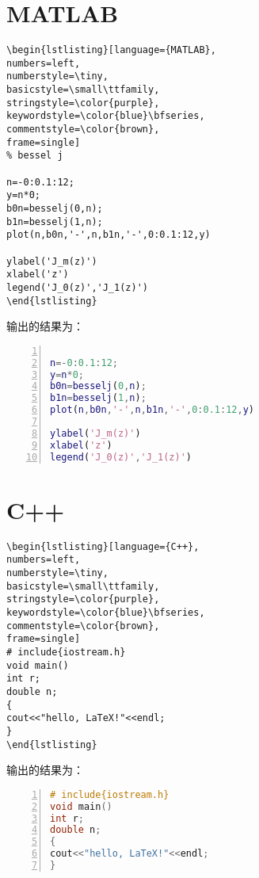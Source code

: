 \section{MATLAB}\label{appendixB-3}
\begin{verbatim}
\begin{lstlisting}[language={MATLAB},
numbers=left,
numberstyle=\tiny,
basicstyle=\small\ttfamily,
stringstyle=\color{purple},
keywordstyle=\color{blue}\bfseries,
commentstyle=\color{brown},
frame=single]
% bessel j

n=-0:0.1:12;
y=n*0;
b0n=besselj(0,n);
b1n=besselj(1,n);
plot(n,b0n,'-',n,b1n,'-',0:0.1:12,y)

ylabel('J_m(z)')
xlabel('z')
legend('J_0(z)','J_1(z)')
\end{lstlisting}
\end{verbatim}
输出的结果为：
\begin{lstlisting}[language={MATLAB},
numbers=left,
numberstyle=\tiny,
basicstyle=\small\ttfamily,
stringstyle=\color{purple},
keywordstyle=\color{blue}\bfseries,
commentstyle=\color{brown},
frame=single]
% bessel j

n=-0:0.1:12;
y=n*0;
b0n=besselj(0,n);
b1n=besselj(1,n);
plot(n,b0n,'-',n,b1n,'-',0:0.1:12,y)

ylabel('J_m(z)')
xlabel('z')
legend('J_0(z)','J_1(z)')
\end{lstlisting}

\section{C++}\label{appendixB-4}
\begin{verbatim}
\begin{lstlisting}[language={C++},
numbers=left,
numberstyle=\tiny,
basicstyle=\small\ttfamily,
stringstyle=\color{purple},
keywordstyle=\color{blue}\bfseries,
commentstyle=\color{brown},
frame=single]
# include{iostream.h}
void main()
int r;
double n;
{
cout<<"hello, LaTeX!"<<endl;
}
\end{lstlisting}
\end{verbatim}
输出的结果为：
\begin{lstlisting}[language={C++},
numbers=left,
numberstyle=\tiny,
basicstyle=\small\ttfamily,
stringstyle=\color{purple},
keywordstyle=\color{blue}\bfseries,
commentstyle=\color{brown},
frame=single]
# include{iostream.h}
void main()
int r;
double n;
{
cout<<"hello, LaTeX!"<<endl;
}
\end{lstlisting}
